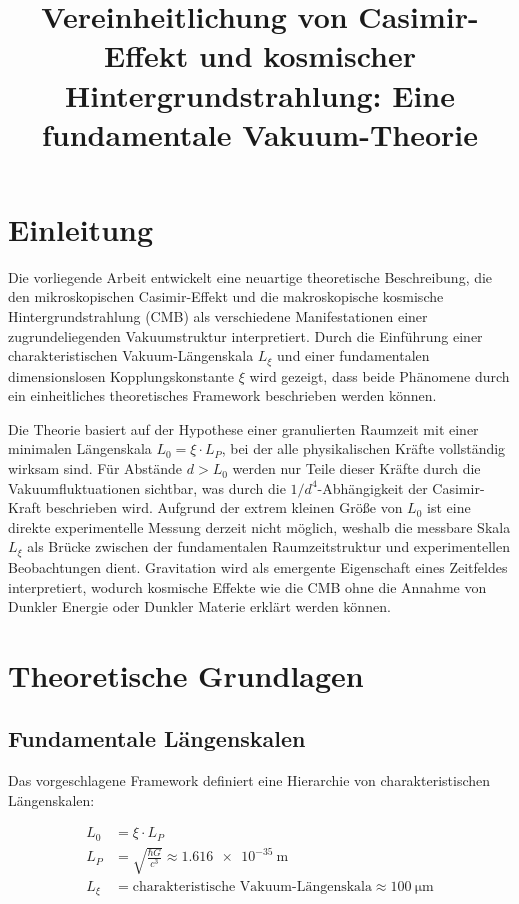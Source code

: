 \documentclass[12pt,a4paper]{article}
\begin{document}
	
	\title{Vereinheitlichung von Casimir-Effekt und kosmischer Hintergrundstrahlung: Eine fundamentale Vakuum-Theorie}
	\author{}
	\date{}
	\maketitle
	
	\section{Einleitung}
	
	Die vorliegende Arbeit entwickelt eine neuartige theoretische Beschreibung, die den mikroskopischen Casimir-Effekt und die makroskopische kosmische Hintergrundstrahlung (CMB) als verschiedene Manifestationen einer zugrundeliegenden Vakuumstruktur interpretiert. Durch die Einführung einer charakteristischen Vakuum-Längenskala \( L_\xi \) und einer fundamentalen dimensionslosen Kopplungskonstante \( \xi \) wird gezeigt, dass beide Phänomene durch ein einheitliches theoretisches Framework beschrieben werden können.
	
	Die Theorie basiert auf der Hypothese einer granulierten Raumzeit mit einer minimalen Längenskala \( L_0 = \xi \cdot L_P \), bei der alle physikalischen Kräfte vollständig wirksam sind. Für Abstände \( d > L_0 \) werden nur Teile dieser Kräfte durch die Vakuumfluktuationen sichtbar, was durch die \( 1/d^4 \)-Abhängigkeit der Casimir-Kraft beschrieben wird. Aufgrund der extrem kleinen Größe von \( L_0 \) ist eine direkte experimentelle Messung derzeit nicht möglich, weshalb die messbare Skala \( L_\xi \) als Brücke zwischen der fundamentalen Raumzeitstruktur und experimentellen Beobachtungen dient. Gravitation wird als emergente Eigenschaft eines Zeitfeldes interpretiert, wodurch kosmische Effekte wie die CMB ohne die Annahme von Dunkler Energie oder Dunkler Materie erklärt werden können.
	
	\section{Theoretische Grundlagen}
	
	\subsection{Fundamentale Längenskalen}
	
	Das vorgeschlagene Framework definiert eine Hierarchie von charakteristischen Längenskalen:
	
	\begin{align}
		L_0 &= \xi \cdot L_P \label{eq:L0_definition}\\
		L_P &= \sqrt{\frac{\hbar G}{c^3}} \approx \SI{1.616e-35}{\meter} \label{eq:planck_length}\\
		L_\xi &= \text{charakteristische Vakuum-Längenskala} \approx \SI{100}{\micro\meter} \label{eq:Lxi_definition}
	\end{align}
	
\end{document}
